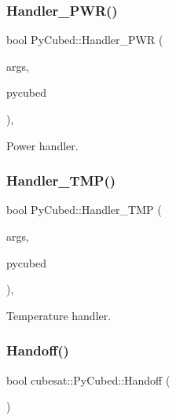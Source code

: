 \subsubsection{\texorpdfstring{Handler\+\_\+\+P\+W\+R()}{Handler\_PWR()}}
{\footnotesize\ttfamily bool Py\+Cubed\+::\+Handler\+\_\+\+P\+WR (\begin{DoxyParamCaption}\item[{std\+::vector$<$ std\+::string $>$}]{args,  }\item[{\hyperlink{classcubesat_1_1PyCubed}{Py\+Cubed} \&}]{pycubed }\end{DoxyParamCaption})\hspace{0.3cm}{\ttfamily [static]}, {\ttfamily [private]}}



Power handler. 

\mbox{\label{classcubesat_1_1PyCubed_a29cb9887d439e8fe784ebf9bc66187d9}} 
\subsubsection{\texorpdfstring{Handler\+\_\+\+T\+M\+P()}{Handler\_TMP()}}
{\footnotesize\ttfamily bool Py\+Cubed\+::\+Handler\+\_\+\+T\+MP (\begin{DoxyParamCaption}\item[{std\+::vector$<$ std\+::string $>$}]{args,  }\item[{\hyperlink{classcubesat_1_1PyCubed}{Py\+Cubed} \&}]{pycubed }\end{DoxyParamCaption})\hspace{0.3cm}{\ttfamily [static]}, {\ttfamily [private]}}



Temperature handler. 

\mbox{\label{classcubesat_1_1PyCubed_a0c707ebefe9fd00e2d1e602209c1e5a6}} 
\subsubsection{\texorpdfstring{Handoff()}{Handoff()}}
{\footnotesize\ttfamily bool cubesat\+::\+Py\+Cubed\+::\+Handoff (\begin{DoxyParamCaption}{ }\end{DoxyParamCaption})\hspace{0.3cm}{\ttfamily [inline]}}



